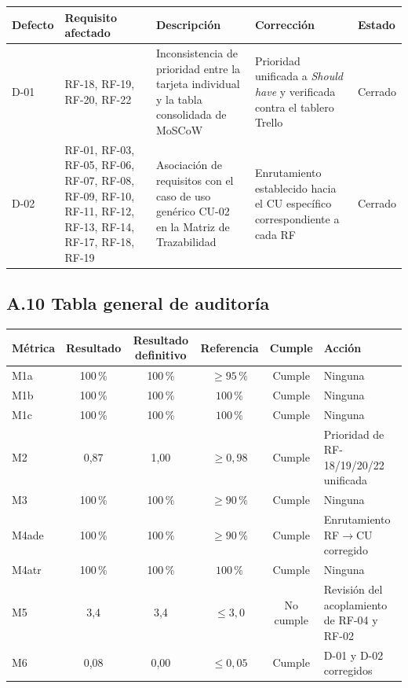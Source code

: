 \begin{tabular}{p{1.4cm}p{2cm}p{4cm}p{3cm}p{1.8cm}}
\hline
\textbf{Defecto} &
\textbf{Requisito afectado} &
\textbf{Descripción} &
\textbf{Corrección} &
\textbf{Estado} \\
\hline

D-01 &
RF-18, RF-19, RF-20, RF-22 &
Inconsistencia de prioridad entre la tarjeta individual y la tabla
consolidada de MoSCoW &
Prioridad unificada a \emph{Should have} y verificada contra
el tablero Trello &
Cerrado \\

D-02 &
RF-01, RF-03, RF-05, RF-06, RF-07, RF-08, RF-09,
RF-10, RF-11, RF-12, RF-13, RF-14, RF-17, RF-18, RF-19 &
Asociación de requisitos con el caso de uso genérico CU-02 en la
Matriz de Trazabilidad &
Enrutamiento establecido hacia el CU específico correspondiente
a cada RF &
Cerrado \\

\hline
\end{tabular}

\subsection*{A.10 Tabla general de auditoría}

\begin{tabular}{lccccl}
\hline
\textbf{Métrica} &
\textbf{Resultado} &
\textbf{Resultado definitivo} &
\textbf{Referencia} &
\textbf{Cumple} &
\textbf{Acción} \\
\hline

M1a &
100\,\% &
100\,\% &
$\geq95\,\%$ &
Cumple &
Ninguna \\

M1b &
100\,\% &
100\,\% &
$100\,\%$ &
Cumple &
Ninguna \\

M1c &
100\,\% &
100\,\% &
$100\,\%$ &
Cumple &
Ninguna \\

M2 &
0,87 &
1,00 &
$\geq0{,}98$ &
Cumple &
Prioridad de RF-18/19/20/22 unificada \\

M3 &
100\,\% &
100\,\% &
$\geq90\,\%$ &
Cumple &
Ninguna \\

M4ade &
100\,\% &
100\,\% &
$\geq90\,\%$ &
Cumple &
Enrutamiento RF$\rightarrow$CU corregido \\

M4atr &
100\,\% &
100\,\% &
$100\,\%$ &
Cumple &
Ninguna \\

M5 &
3,4 &
3,4 &
$\leq3{,}0$ &
No cumple &
Revisión del acoplamiento de RF-04 y RF-02 \\

M6 &
0,08 &
0,00 &
$\leq0{,}05$ &
Cumple &
D-01 y D-02 corregidos \\

\hline
\end{tabular}

